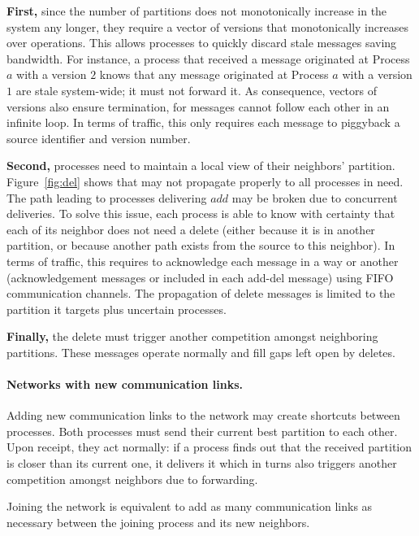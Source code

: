 \noindent \textbf{First,} since the number of partitions does not
monotonically increase in the system any longer, they require a vector
of versions that monotonically increases over 
operations. This allows processes to quickly discard stale messages
saving bandwidth. For instance, a process that received a message
originated at Process $a$ with a version $2$ knows that any message
originated at Process $a$ with a version $1$ are stale system-wide; it
must not forward it. As consequence, vectors of versions also ensure
termination, for messages  cannot follow each other
in an infinite loop. In terms of traffic, this only requires each
 message to piggyback a source identifier and version
number.

\noindent \textbf{Second,} processes need to maintain a local view of
their neighbors' partition.  Figure~\ref{fig:del} shows that
 may not propagate properly to all processes in
need. The path leading to processes delivering $add$ may be broken due
to concurrent deliveries.  To solve this issue, each process is able
to know with certainty that each of its neighbor does not need a
delete (either because it is in another partition, or because another
path exists from the source to this neighbor).  In terms of traffic, this requires to acknowledge each message
in a way or another (acknowledgement messages or included in each
add-del message) using FIFO communication channels. The propagation of
delete messages is limited to the partition it targets plus uncertain
processes.

\noindent \textbf{Finally,} the delete must trigger another
competition amongst neighboring partitions. These 
messages operate normally and fill gaps left open by deletes.

\paragraph{Networks with new communication links.}
Adding new communication links to the network may create shortcuts
between processes. Both processes must send their current best
partition to each other. Upon receipt, they act normally: if a process
finds out that the received partition is closer than its current one,
it delivers it which in turns also triggers another competition
amongst neighbors due to forwarding.

Joining the network is equivalent to add as many communication links
as necessary between the joining process and its new neighbors.

